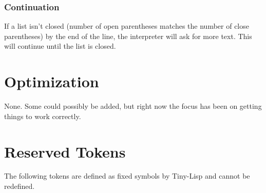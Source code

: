 \documentclass[10pt, openany]{book}
\newcommand{\tl}{Tiny-Lisp}
\begin{document}
\subsubsection{Continuation}
If a list isn't closed (number of open parentheses matches the number of close parentheses) by the end of the line, the interpreter will ask for more text.  This will continue until the list is closed.

\section{Optimization}
None.  Some could possibly be added, but right now the focus has been on getting things to work correctly.

\section{Reserved Tokens}
The following tokens are defined as fixed symbols by \tl{} and cannot be redefined.
\end{document}

